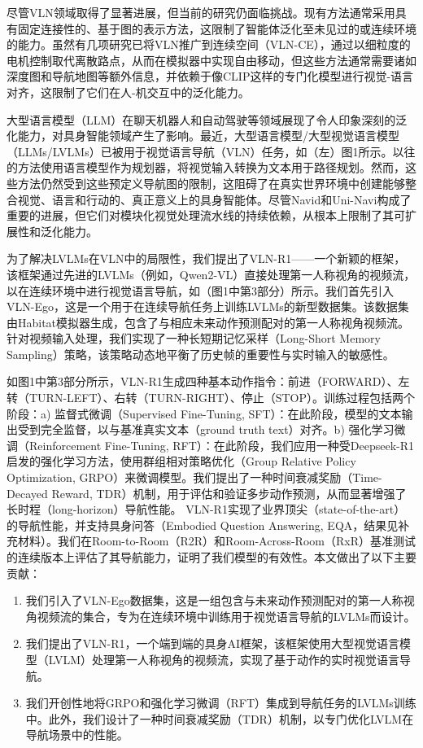 尽管VLN领域取得了显著进展，但当前的研究仍面临挑战。现有方法通常采用具有固定连接性的、基于图的表示方法，这限制了智能体泛化至未见过的或连续环境的能力。虽然有几项研究已将VLN推广到连续空间（VLN-CE），通过以细粒度的电机控制取代离散路点，从而在模拟器中实现自由移动，但这些方法通常需要诸如深度图和导航地图等额外信息，并依赖于像CLIP这样的专门化模型进行视觉-语言对齐，这限制了它们在人-机交互中的泛化能力。

大型语言模型（LLM）在聊天机器人和自动驾驶等领域展现了令人印象深刻的泛化能力，对具身智能领域产生了影响。最近，大型语言模型/大型视觉语言模型（LLMs/LVLMs）已被用于视觉语言导航（VLN）任务，如（左）图1所示。以往的方法使用语言模型作为规划器，将视觉输入转换为文本用于路径规划。然而，这些方法仍然受到这些预定义导航图的限制，这阻碍了在真实世界环境中创建能够整合视觉、语言和行动的、真正意义上的具身智能体。尽管Navid和Uni-Navi构成了重要的进展，但它们对模块化视觉处理流水线的持续依赖，从根本上限制了其可扩展性和泛化能力。

为了解决LVLMs在VLN中的局限性，我们提出了VLN-R1——一个新颖的框架，该框架通过先进的LVLMs（例如，Qwen2-VL）直接处理第一人称视角的视频流，以在连续环境中进行视觉语言导航，如（图1中第3部分）所示。我们首先引入VLN-Ego，这是一个用于在连续导航任务上训练LVLMs的新型数据集。该数据集由Habitat模拟器生成，包含了与相应未来动作预测配对的第一人称视角视频流。针对视频输入处理，我们实现了一种长短期记忆采样（Long-Short Memory Sampling）策略，该策略动态地平衡了历史帧的重要性与实时输入的敏感性。

如图1中第3部分所示，VLN-R1生成四种基本动作指令：前进（FORWARD）、左转（TURN-LEFT）、右转（TURN-RIGHT）、停止（STOP）。训练过程包括两个阶段：a) 监督式微调（Supervised Fine-Tuning, SFT）：在此阶段，模型的文本输出受到完全监督，以与基准真实文本（ground truth text）对齐。b) 强化学习微调（Reinforcement Fine-Tuning, RFT）：在此阶段，我们应用一种受Deepseek-R1启发的强化学习方法，使用群组相对策略优化（Group Relative Policy Optimization, GRPO）来微调模型。我们提出了一种时间衰减奖励（Time-Decayed Reward, TDR）机制，用于评估和验证多步动作预测，从而显著增强了长时程（long-horizon）导航性能。
VLN-R1实现了业界顶尖（state-of-the-art）的导航性能，并支持具身问答（Embodied Question Answering, EQA，结果见补充材料）。我们在Room-to-Room（R2R）和Room-Across-Room（RxR）基准测试的连续版本上评估了其导航能力，证明了我们模型的有效性。本文做出了以下主要贡献：
\begin{enumerate}
    \item[$\bullet$] 我们引入了VLN-Ego数据集，这是一组包含与未来动作预测配对的第一人称视角视频流的集合，专为在连续环境中训练用于视觉语言导航的LVLMs而设计。
    \item[$\bullet$] 我们提出了VLN-R1，一个端到端的具身AI框架，该框架使用大型视觉语言模型（LVLM）处理第一人称视角的视频流，实现了基于动作的实时视觉语言导航。
    \item[$\bullet$] 我们开创性地将GRPO和强化学习微调（RFT）集成到导航任务的LVLMs训练中。此外，我们设计了一种时间衰减奖励（TDR）机制，以专门优化LVLM在导航场景中的性能。 
\end{enumerate}

